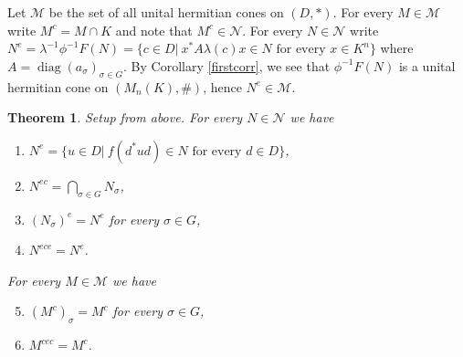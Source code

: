 \documentclass[12pt,reqno]{amsart}
\newtheorem{thm}{Theorem}
\theoremstyle{definition}
\DeclareMathOperator{\diag}{diag}
\begin{document}
Let $\mathcal{M}$ be the set of all unital hermitian cones on $(D,\ast)$. For every 
$M \in \mathcal{M}$ write $M^c = M \cap K$ and note that $M^c \in \mathcal{N}$.
For every $N \in \mathcal{N}$ write $N^e = \lambda^{-1}\phi^{-1}F(N)=
\{c \in D \vert \ x^\ast A \lambda(c) x \in N \mbox{ for every } x \in K^n \}$
where $A =\diag(a_\sigma)_{\sigma \in G}$. By Corollary \ref{firstcorr}, we
see that $\phi^{-1}F(N)$ is a unital hermitian cone on $(M_n(K),\#)$,
hence $N^e \in \mathcal{M}$.

\begin{thm}
\label{mainext}
Setup from above. For every $N \in \mathcal{N}$ we have 
\begin{enumerate}
\item $N^e =\{u \in D \vert \ f(d^\ast u d) \in N \mbox{ for every } d \in D\}$,
\item $N^{ec} = \bigcap_{\sigma \in G} N_\sigma$,
\item $(N_\sigma)^e = N^e$ for every $\sigma \in G$,
\item $N^{ece} = N^e$. 
\end{enumerate} 
For every $M \in \mathcal{M}$ we have 
\begin{enumerate}
\setcounter{enumi}{4}
\item $(M^c)_\sigma = M^c$ for every $\sigma \in G$,
\item $M^{cec}=M^c$.
\end{enumerate}
\end{thm}
\end{document}
